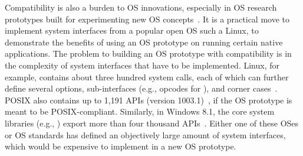 Compatibility is also a burden to OS innovations, especially in OS research prototypes
built for experimenting new OS concepts~\cite{baumann09barrelfish,unikernels,zeldovich+histar,libra,peter14arrakis,belay14ix}.
It is a practical move to implement system interfaces from a popular open OS such a Linux,
to demonstrate the benefits of using an OS prototype
on running certain native applications.
The problem to building an OS prototype with compatibility is in the complexity
of system interfaces that have to be implemented.
Linux, for example,
contains about three hundred system calls,
each of which 
can further define several options, sub-interfaces (e.g., opcodes for ), and corner cases~\cite{linux-man-syscall}.
POSIX also contains up to 1,191 APIs (version 1003.1)~\cite{ieee-posix}, if the OS prototype is meant to be POSIX-compliant. %
Similarly, in Windows 8.1, the core system libraries (e.g., ) export more than four thousand APIs~\cite{win-api}.
Either one of these OSes or OS standards has defined an objectively large amount of system interfaces, which would be
expensive to implement in a new OS prototype.




